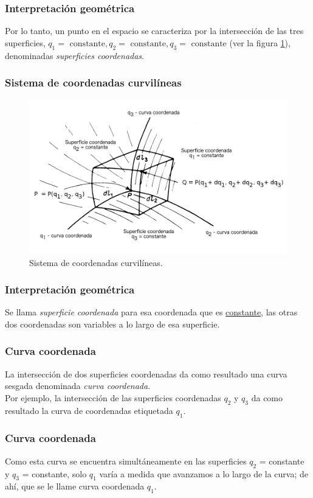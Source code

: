 \begin{frame}
\frametitle{Interpretación geométrica}
Por lo tanto, un punto en el espacio se caracteriza por la intersección de las tres superficies, $q_{1} = \mbox{ constante}, q_{2} = \mbox{ constante}, q_{3} = \mbox{ constante}$ (ver la figura \ref{fig:figura_A_01}), denominadas \emph{superficies coordenadas}.
\end{frame}
\begin{frame}[label=figura_01]
\frametitle{Sistema de coordenadas curvilíneas}
\begin{figure}[H]
   \centering
   \includegraphics[scale=0.28]{Imagenes/CoordenadasCurvilineas_01.png}
   \caption{Sistema de coordenadas curvilíneas.}
   \label{fig:figura_A_01}
\end{figure}
\end{frame}
\begin{frame}
\frametitle{Interpretación geométrica}
Se llama \emph{superficie coordenada} para esa coordenada que es \underline{constante}, las otras dos coordenadas son variables a lo largo de esa superficie.
\end{frame}
\begin{frame}
\frametitle{Curva coordenada}
La intersección de dos superficies coordenadas da como resultado una curva sesgada denominada \emph{curva coordenada}.
\\
\bigskip
Por ejemplo, la intersección de las superficies coordenadas $q_{2}$ y $q_{3}$ da como resultado la curva de coordenadas etiquetada $q_{1}$.
\end{frame}
\begin{frame}
\frametitle{Curva coordenada}
Como esta curva se encuentra simultáneamente en las superficies $q_{2}$ = constante y $q_{3}$ = constante, solo $q_{1}$ varía a medida que avanzamos a lo largo de la curva; de ahí, que se le llame curva coordenada $q_{1}$.
\end{frame}
